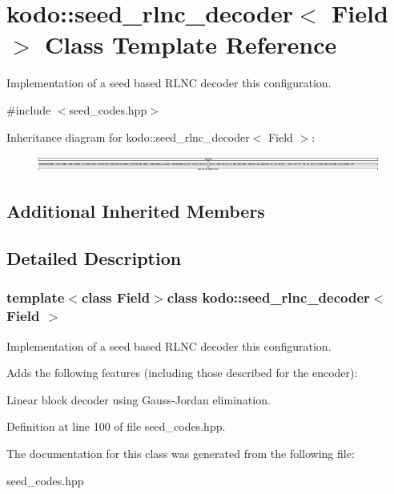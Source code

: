 \hypertarget{classkodo_1_1seed__rlnc__decoder}{\section{kodo\-:\-:seed\-\_\-rlnc\-\_\-decoder$<$ Field $>$ Class Template Reference}
\label{classkodo_1_1seed__rlnc__decoder}
}


Implementation of a seed based R\-L\-N\-C decoder this configuration.  




{\ttfamily \#include $<$seed\-\_\-codes.\-hpp$>$}

Inheritance diagram for kodo\-:\-:seed\-\_\-rlnc\-\_\-decoder$<$ Field $>$\-:\begin{figure}[H]
\begin{center}
\leavevmode
\includegraphics[height=0.536398cm]{classkodo_1_1seed__rlnc__decoder}
\end{center}
\end{figure}
\subsection*{Additional Inherited Members}


\subsection{Detailed Description}
\subsubsection*{template$<$class Field$>$class kodo\-::seed\-\_\-rlnc\-\_\-decoder$<$ Field $>$}

Implementation of a seed based R\-L\-N\-C decoder this configuration. 

Adds the following features (including those described for the encoder)\-:
\begin{DoxyItemize}
\item Linear block decoder using Gauss-\/\-Jordan elimination. 
\end{DoxyItemize}

Definition at line 100 of file seed\-\_\-codes.\-hpp.



The documentation for this class was generated from the following file\-:\begin{DoxyCompactItemize}
\item 
seed\-\_\-codes.\-hpp\end{DoxyCompactItemize}
